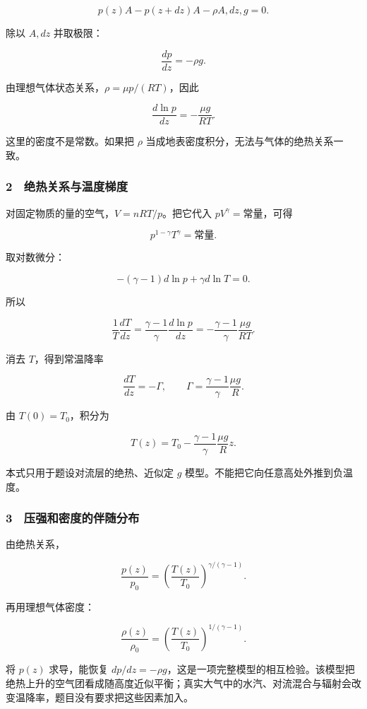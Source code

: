 \documentclass[12pt,a4paper,fontset=fandol]{ctexart}
\begin{document}
\[p(z)A-p(z+dz)A-\rho A,dz,g=0.\]

除以 \(A,dz\) 并取极限：

\[\boxed{\frac{dp}{dz}=-\rho g.}\]

由理想气体状态关系，\(\rho=\mu p/(RT)\)，因此

\[\boxed{\frac{d\ln p}{dz}=-\frac{\mu g}{RT}.}\]

这里的密度不是常数。如果把 \(\rho\)
当成地表密度积分，无法与气体的绝热关系一致。

\subsubsection{2　绝热关系与温度梯度}\label{ux7eddux70edux5173ux7cfbux4e0eux6e29ux5ea6ux68afux5ea6}

对固定物质的量的空气，\(V=nRT/p\)。把它代入 \(pV^\gamma=\)常量，可得

\[p^{1-\gamma}T^\gamma=\text{常量}.\]

取对数微分：

\[-(\gamma-1)d\ln p+\gamma d\ln T=0.\]

所以

\[\frac1T\frac{dT}{dz}
=\frac{\gamma-1}{\gamma}\frac{d\ln p}{dz}
=-\frac{\gamma-1}{\gamma}\frac{\mu g}{RT}.\]

消去 \(T\)，得到常温降率

\[\boxed{\frac{dT}{dz}=-\Gamma,\qquad
\Gamma=\frac{\gamma-1}{\gamma}\frac{\mu g}{R}.}\]

由 \(T(0)=T_0\)，积分为

\[\boxed{T(z)=T_0-\frac{\gamma-1}{\gamma}\frac{\mu g}{R}z.}\]

本式只用于题设对流层的绝热、近似定 \(g\)
模型。不能把它向任意高处外推到负温度。

\subsubsection{3　压强和密度的伴随分布}\label{ux538bux5f3aux548cux5bc6ux5ea6ux7684ux4f34ux968fux5206ux5e03}

由绝热关系，

\[\frac{p(z)}{p_0}=
\left(\frac{T(z)}{T_0}\right)^{\gamma/(\gamma-1)}.\]

再用理想气体密度：

\[\frac{\rho(z)}{\rho_0}=
\left(\frac{T(z)}{T_0}\right)^{1/(\gamma-1)}.\]

将 \(p(z)\) 求导，能恢复
\(dp/dz=-\rho g\)，这是一项完整模型的相互检验。该模型把绝热上升的空气团看成随高度近似平衡；真实大气中的水汽、对流混合与辐射会改变温降率，题目没有要求把这些因素加入。
\end{document}
